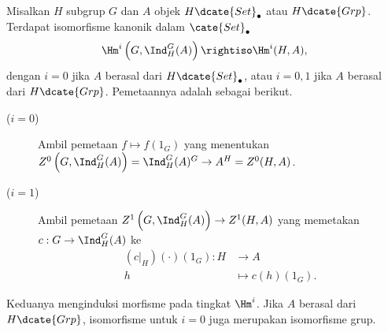 \begin{teorema}\label{prop:Shapiro-noncommutative}
	Misalkan $H$ subgrup $G$ dan $A$ objek $H\dcate{Set}_\bullet$ atau
	$H\dcate{Grp}$. Terdapat isomorfisme kanonik dalam $\cate{Set}_\bullet$
	\[ \Hm^i\left(G, \Ind^G_H(A)\right) \rightiso \Hm^i(H, A), \]
	dengan $i=0$ jika $A$ berasal dari $H\dcate{Set}_\bullet$, atau $i=0,1$
	jika $A$ berasal dari $H\dcate{Grp}$. Pemetaannya adalah sebagai berikut.
	\begin{description}
		\item[($i=0$)] Ambil pemetaan $f\mapsto f(1_G)$ yang menentukan
		$Z^0\left(G,\Ind^G_H(A)\right)=\Ind^G_H(A)^G\to A^H=Z^0(H,A)$.
		\item[($i=1$)] Ambil pemetaan
		$Z^1\left(G,\Ind^G_H(A)\right)\to Z^1(H,A)$ yang memetakan
		$c:G\to\Ind^G_H(A)$ ke
		\begin{align*}
			(c|_H)(\cdot)(1_G): H & \to A \\
			h & \mapsto c(h)(1_G).
		\end{align*}
	\end{description}
	Keduanya menginduksi morfisme pada tingkat $\Hm^i$. Jika $A$ berasal dari
	$H\dcate{Grp}$, isomorfisme untuk $i=0$ juga merupakan isomorfisme grup.
\end{teorema}
